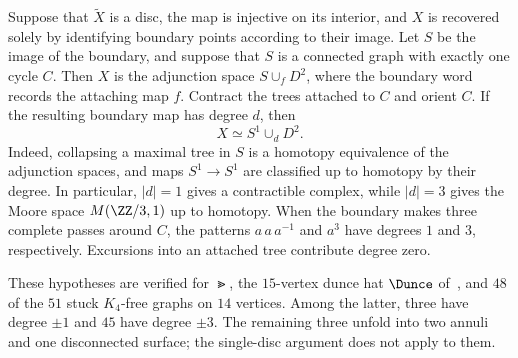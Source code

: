 Suppose that $\widetilde X$ is a disc, the map is injective on its interior, and $X$ is recovered solely by identifying boundary points according to their image. Let $S$ be the image of the boundary, and suppose that $S$ is a connected graph with exactly one cycle $C$. Then $X$ is the adjunction space $S\cup_f D^2$, where the boundary word records the attaching map $f$. Contract the trees attached to $C$ and orient $C$. If the resulting boundary map has degree $d$, then
\[
 X\simeq S^1\cup_d D^2.
\]
Indeed, collapsing a maximal tree in $S$ is a homotopy equivalence of the adjunction spaces, and maps $S^1\to S^1$ are classified up to homotopy by their degree. In particular, $|d|=1$ gives a contractible complex, while $|d|=3$ gives the Moore space $M(\ZZ/3,1)$ up to homotopy. When the boundary makes three complete passes around $C$, the patterns $a\,a\,a^{-1}$ and $a^3$ have degrees $1$ and $3$, respectively. Excursions into an attached tree contribute degree zero.

These hypotheses are verified for $\Gt$, the $15$-vertex dunce hat $\Dunce$ of~\cite{DEFH2023}, and $48$ of the $51$ stuck $K_4$-free graphs on $14$ vertices. Among the latter, three have degree $\pm1$ and $45$ have degree $\pm3$. The remaining three unfold into two annuli and one disconnected surface; the single-disc argument does not apply to them.
